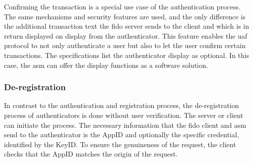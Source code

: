 Confirming the transaction is a special use case of the authentication process. The same mechanisms and security features are used, and the only difference is the additional transaction text the \gls{fido} server sends to the client and which is in return displayed on display from the authenticator. This feature enables the \gls{uaf} protocol to not only authenticate a user but also to let the user confirm certain transactions. The specifications list the authenticator display as optional. In this case, the \gls{asm} can offer the display functions as a software solution.

\subsubsection{De-registration}

In contrast to the authentication and registration process, the de-registration process of authenticators is done without user verification. The server or client can initiate the process. The necessary information that the \gls{fido} client and \gls{asm} send to the authenticator is the AppID and optionally the specific credential, identified by the KeyID. To ensure the genuineness of the request, the client checks that the AppID matches the origin of the request.

